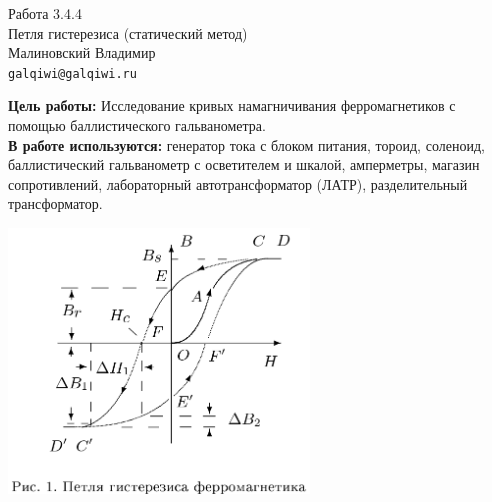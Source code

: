 



\begin{center}
  \LARGE{Работа 3.4.4}\\[0.2cm]
  \LARGE{Петля гистерезиса (статический метод)}\\[0.2cm]
  \large{Малиновский Владимир}\\[0.2cm]
  \normalsize{\texttt{galqiwi@galqiwi.ru}}
\end{center}

\textbf{Цель работы:} Исследование кривых намагничивания ферромагнетиков с помощью баллистического гальванометра.\\
\textbf{В работе используются:} генератор тока с блоком питания, тороид, соленоид, баллистический гальванометр с осветителем и шкалой, амперметры, магазин сопротивлений, лабораторный автотрансформатор (ЛАТР), разделительный трансформатор.\\
\begin{center}
\includegraphics[width=0.60\textwidth]{1.png}
\end{center}
